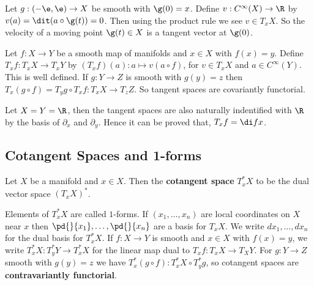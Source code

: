 \begin{eg}
  Let $g : (-\e, \e) \to X$ be smooth with $\g(0) = x$. Define $v : C^\infty(X) \to \R$ by $v(a) = \dit (a \circ \g(t)) = 0$. Then using the product rule we see $v \in T_xX$. So the velocity of a moving point $\g(t) \in X$ is a tangent vector at $\g(0)$.
\end{eg}

\begin{ndefi}
  Let $f : X \to Y$ be a smooth map of manifolds and $x \in X$ with $f(x) = y$. Define $T_xf : T_xX \to T_xY$ by $(T_xf)(a) : a \mapsto v(a \circ f)$, for $v \in T_xX$ and $a \in C^\infty(Y)$. This is well defined. If $g : Y \to Z$ is smooth with $g(y) = z$ then $T_x(g \circ f) = T_y g \circ T_xf : T_xX \to T_zZ$. So tangent spaces are covariantly functorial.
\end{ndefi}

\begin{remark}
   Let $X = Y = \R$, then the tangent spaces are also naturally indentified with $\R$ by the basis of $\partial_x$ and $\partial_y$. Hence it can be proved that, $T_x f = \di f x$.
\end{remark}

\subsection{Cotangent Spaces and 1-forms}
\begin{ndefi}[]
  Let $X$ be a manifold and $x \in X$. Then the \textbf{cotangent space} $T_x^*X$ to be the dual vector space $(T_xX)^*$.
\end{ndefi}
\noindent
Elements of $T_x^*X$ are called $1$-forms. If $(x_1, \dots, x_n)$ are local coordinates on $X$ near $x$ then $\pd{}{x_1}, \dots, \pd{}{x_n}$ are a basis for $T_xX$. We write $dx_1, \dots, dx_n$ for the dual basis for $T_x^*X$. If $f : X \to Y$ is smooth and $x \in X$
with $f(x) = y$, we write $T_x^*X : T_y^*Y \to T_x^*X$ for the linear map dual to $T_xf : T_xX \to T_XY$. For $g : Y \to Z$ smooth with $g(y) = z$ we have $T_x^* (g\circ f) : T_x^*X \circ T_y^*g$, so cotangent spaces are \textbf{contravariantly functorial}.

